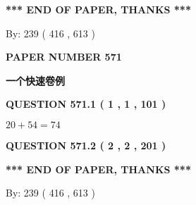 \documentclass{ctexart}
\begin{document}
   
 \vspace{0.2in}
 
   
   
   
   
\vspace{1.0in} 
{\textbf{\large{ *** END OF PAPER, THANKS *** }}} 
   
   
\hspace{1.0in} By: 
 239 ( 416 ,  613 )
   
   
   
   
\newpage 
\setcounter{page}{ 
   571001 } 
   
   
   
   
 {\textbf{ \Large{ PAPER NUMBER  571  }}}
   
   
\vspace{0.2in}
   
   
   
   
   
   
 \vspace{0.2in}
{\LARGE {\textbf{ 一个快速卷例}}}
   
   
  
\vspace{0.2in}
  
{\textbf{\Large{QUESTION
571.1 
 ( 1 , 1 , 101 )
}}}
  
  
 
 

$ %
20 +  %
54=   %
74$
 
 
  
\vspace{0.2in}
  
{\textbf{\Large{QUESTION
571.2 
 ( 2 , 2 , 201 )
}}}
  
  
   
   
 \vspace{0.2in}
 
   
   
   
   
\vspace{1.0in} 
{\textbf{\large{ *** END OF PAPER, THANKS *** }}} 
   
   
\hspace{1.0in} By: 
 239 ( 416 ,  613 )
   
   
   
   
\newpage 
\setcounter{page}{ 
   572001 } 
   
   
   
\end{document}
